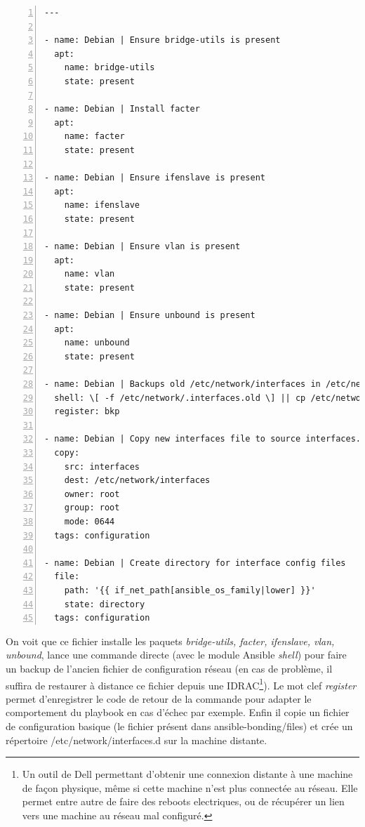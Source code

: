\documentclass[14 pt,a4paper]{extreport}
\begin{document}
\begin{framed}
\begin{Verbatim}[fontsize=\tiny,numbers=left]
---

- name: Debian | Ensure bridge-utils is present
  apt:
    name: bridge-utils
    state: present

- name: Debian | Install facter
  apt:
    name: facter
    state: present

- name: Debian | Ensure ifenslave is present
  apt:
    name: ifenslave
    state: present

- name: Debian | Ensure vlan is present
  apt:
    name: vlan
    state: present

- name: Debian | Ensure unbound is present
  apt:
    name: unbound
    state: present
 
- name: Debian | Backups old /etc/network/interfaces in /etc/network/.interfaces.old
  shell: \[ -f /etc/network/.interfaces.old \] || cp /etc/network/interfaces /etc/network/.interfaces.old
  register: bkp

- name: Debian | Copy new interfaces file to source interfaces.d
  copy:
    src: interfaces
    dest: /etc/network/interfaces
    owner: root
    group: root
    mode: 0644
  tags: configuration

- name: Debian | Create directory for interface config files
  file:
    path: '{{ if_net_path[ansible_os_family|lower] }}'
    state: directory
  tags: configuration

\end{Verbatim}
\end{framed}

On voit que ce fichier installe les paquets \emph{bridge-utils, facter, ifenslave, vlan, unbound}, lance une commande directe (avec le module Ansible \emph{shell}) pour faire un backup de l'ancien fichier de configuration réseau (en cas de problème, il suffira de restaurer à distance ce fichier depuis une IDRAC\footnote{Un outil de Dell permettant d'obtenir une connexion distante à une machine de façon physique, même si cette machine n'est plus connectée au réseau. Elle permet entre autre de faire des reboots electriques, ou de récupérer un lien vers une machine au réseau mal configuré.}). Le mot clef \emph{register} permet d'enregistrer le code de retour de la commande pour adapter le comportement du playbook en cas d'échec par exemple. Enfin il copie un fichier de configuration basique (le fichier présent dans ansible-bonding/files) et crée un répertoire /etc/network/interfaces.d sur la machine distante.
\end{document}
